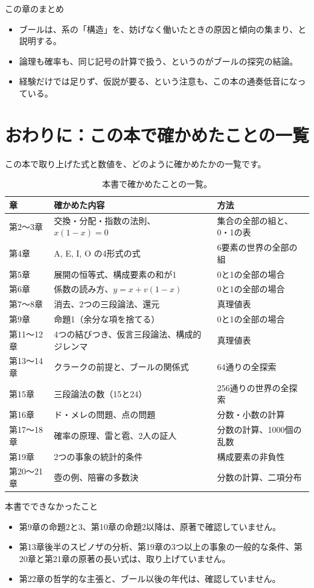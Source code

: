 \documentclass[a4paper,11pt,openany]{ltjsbook}
\begin{document}
\begin{pointbox}{この章のまとめ}
\begin{itemize}[leftmargin=*]
\item ブールは、系の「構造」を、妨げなく働いたときの原因と傾向の集まり、と説明する。
\item 論理も確率も、同じ記号の計算で扱う、というのがブールの探究の結論。
\item 経験だけでは足りず、仮説が要る、という注意も、この本の通奏低音になっている。
\end{itemize}
\end{pointbox}

\chapter*{おわりに：この本で確かめたことの一覧}

この本で取り上げた式と数値を、どのように確かめたかの一覧です。

\begin{table}[htbp]
\centering
\small
\begin{tabular}{lll}
\toprule
章 & 確かめた内容 & 方法\\
\midrule
第2〜3章 & 交換・分配・指数の法則、$x(1-x)=0$ & 集合の全部の組と、0・1の表\\
第4章 & A, E, I, O の4形式の式 & 6要素の世界の全部の組\\
第5章 & 展開の恒等式、構成要素の和が1 & 0と1の全部の場合\\
第6章 & 係数の読み方、$y=x+v(1-x)$ & 0と1の全部の場合\\
第7〜8章 & 消去、2つの三段論法、還元 & 真理値表\\
第9章 & 命題1（余分な項を捨てる） & 0と1の全部の場合\\
第11〜12章 & 4つの結びつき、仮言三段論法、構成的ジレンマ & 真理値表\\
第13〜14章 & クラークの前提と、ブールの関係式 & 64通りの全探索\\
第15章 & 三段論法の数（15と24） & 256通りの世界の全探索\\
第16章 & ド・メレの問題、点の問題 & 分数・小数の計算\\
第17〜18章 & 確率の原理、雷と雹、2人の証人 & 分数の計算、1000個の乱数\\
第19章 & 2つの事象の統計的条件 & 構成要素の非負性\\
第20〜21章 & 壺の例、陪審の多数決 & 分数の計算、二項分布\\
\bottomrule
\end{tabular}
\caption{本書で確かめたことの一覧。}
\end{table}

\begin{notebox}{本書でできなかったこと}
\begin{itemize}[leftmargin=*]
\item 第9章の命題2と3、第10章の命題2以降は、原著で確認していません。
\item 第13章後半のスピノザの分析、第19章の3つ以上の事象の一般的な条件、第20章と第21章の原著の長い式は、取り上げていません。
\item 第22章の哲学的な主張と、ブール以後の年代は、確認していません。
\end{itemize}
\end{notebox}
\end{document}
